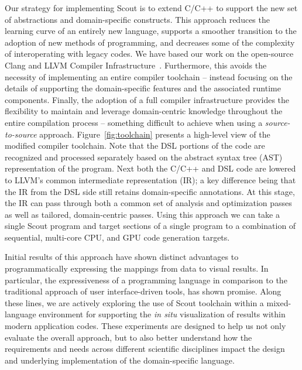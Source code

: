 \documentclass{tcvg}
\newcommand{\backgroundpic}[1] {
	\ClearShipoutPicture
	\AddToShipoutPicture{
		\put(0,0) {
			\parbox[b][\paperheight]{\paperwidth}{
				\vfill
				\centering
				\texttt{[image: \#1]}
				\vfill
			}
		}
	}
}
\begin{document}
    Our strategy for implementing Scout is to extend C/C++ to
    support the new set of abstractions and domain-specific constructs. 
    This approach reduces the learning curve of an entirely 
    new language, supports a smoother transition to the adoption of new
    methods of programming, and decreases some of the complexity of interoperating
    with legacy codes.  We have based our work on the open-source
    Clang and LLVM Compiler Infrastructure~\cite{Clang:2012,LLVM:2012}.  
    Furthermore, this avoids the necessity of implementing an entire 
    compiler toolchain -- instead focusing on the details of supporting 
    the domain-specific features and the associated runtime components.
    Finally, the adoption of a full compiler infrastructure provides  
    the flexibility to maintain and leverage domain-centric knowledge throughout the
    entire compilation process -- something
    difficult to achieve when using a \emph{source-to-source} approach. 
    Figure~\ref{fig:toolchain} presents a
    high-level view of the modified compiler toolchain.  Note that the
    DSL portions of the code are recognized and processed separately 
    based on the abstract syntax tree (AST) representation of the program.
    Next both the C/C++ and DSL code are lowered to LLVM's common 
    intermediate representation (IR); a key difference being that the IR
    from the DSL side still retains domain-specific annotations. At this 
    stage, the IR can pass through both a common set of analysis and 
    optimization passes as well as tailored, domain-centric passes. Using 
    this approach we can take a single Scout program and target sections 
    of a single program to a combination of sequential, multi-core CPU, 
    and GPU code generation targets.

  \backgroundpic{figures/bg-back.pdf}

    Initial results of this approach have shown distinct advantages to
    programmatically expressing the mappings from data to visual results.
    In particular, the expressiveness of a programming language in 
    comparison to the traditional approach of user interface-driven tools, 
    has shown promise.  Along these lines, we are actively exploring the 
    use of Scout toolchain within a mixed-language environment for 
    supporting the \emph{in situ} visualization of results within modern
    application codes.  These experiments are designed to help us not 
    only evaluate the overall approach, but to also better understand how
    the requirements and needs across different scientific disciplines
    impact the design and underlying implementation of the domain-specific
    language.  
\end{document}
